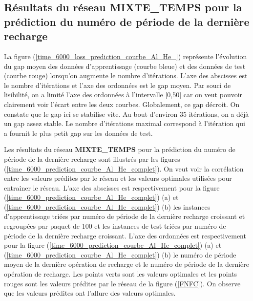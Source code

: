 \subsection{Résultats du réseau \textbf{MIXTE\_TEMPS} pour la prédiction du numéro de période de la dernière recharge}

La figure (\ref{time_6000_loss_prediction_courbe_Al_He_}) représente l'évolution du gap moyen des données d'apprentissage (courbe bleue) et des données de test (courbe rouge) lorsqu'on augmente le nombre d'itérations. L'axe des abscisses est le nombre d'itérations et l'axe des ordonnées est le gap moyen. Par souci de lisibilité, on a limité l'axe des ordonnées à l'intervalle [0,50] car on veut pouvoir clairement voir l'écart entre les deux courbes. Globalement, ce gap décroit. On constate que le gap ici se stabilise vite. Au bout d'environ 35 itérations, on a déjà un gap assez stable. Le nombre d'itérations maximal correspond à l'itération qui a fournit le plus petit gap sur les données de test.

Les résultats du réseau \textbf{MIXTE\_TEMPS} pour la prédiction du numéro de période de la dernière recharge sont illustrés par les figures  (\ref{time_6000_prediction_courbe_Al_He_complet}). On veut voir la corrélation entre les valeurs prédites par le réseau et les valeurs optimales utilisées pour entrainer le réseau. L'axe des abscisses est respectivement pour la figure (\ref{time_6000_prediction_courbe_Al_He_complet}) (a) et (\ref{time_6000_prediction_courbe_Al_He_complet}) (b) les instances d'apprentissage triées par numéro de période de la dernière recharge croissant et regroupées par paquet de 100 et les instances de test triées par numéro de période de la dernière recharge croissant. L'axe des ordonnées est respectivement pour la figure (\ref{time_6000_prediction_courbe_Al_He_complet}) (a) et (\ref{time_6000_prediction_courbe_Al_He_complet}) (b) le numéro de période moyen de la dernière opération de recharge et le numéro de période de la dernière opération de recharge. Les points verts sont les valeurs optimales et les points rouges sont les valeurs prédites par le réseau de la figure (\ref{FNFC}). On observe que les valeurs prédites ont l'allure des valeurs optimales.



